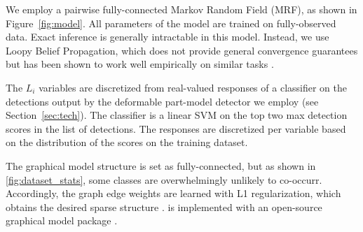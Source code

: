 We employ a pairwise fully-connected Markov Random Field (MRF), as shown in Figure~\ref{fig:model}.
All parameters of the model are trained on fully-observed data.
Exact inference is generally intractable in this model.
Instead, we use Loopy Belief Propagation, which does not provide general convergence guarantees but has been shown to work well empirically on similar tasks \cite{Desai2009}.

The $L_i$ variables are discretized from real-valued responses of a classifier on the detections output by the deformable part-model detector we employ (see Section~\ref{sec:tech}).
The classifier is a linear SVM on the top two max detection scores in the list of detections.
The responses are discretized per variable based on the distribution of the scores on the training dataset.

The graphical model structure is set as fully-connected, but as shown in \autoref{fig:dataset_stats}, some classes are overwhelmingly unlikely to co-occurr.
Accordingly, the graph edge weights are learned with L1 regularization, which obtains the desired sparse structure \cite{Lee2006}.
 is implemented with an open-source graphical model package \cite{Jaimovich2010}.
 